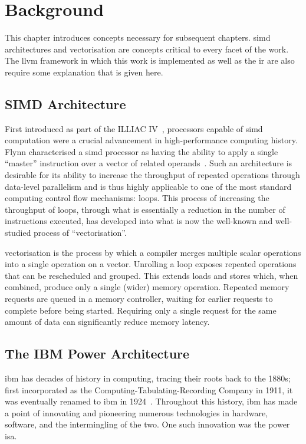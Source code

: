 \documentclass[\main/thesis.tex]{subfiles}
\begin{document}
\chapter{Background}
\label{cha:background}
This chapter introduces concepts necessary for subsequent chapters.
\gls{simd} architectures and vectorisation are concepts critical to every facet of the work.
The \gls{llvm} framework in which this work is implemented as well as the \gls{ir} are also require some explanation that is given here.

\section{SIMD Architecture}
\label{sec:simd}
First introduced as part of the ILLIAC IV~\autocite{barnes1968illiac}, processors capable of \gls{simd} computation were a crucial advancement in high-performance computing history.
Flynn characterised a \gls{simd} processor as having the ability to apply a single ``master'' instruction over a vector of related operands~\autocite{flynn1972some}.
Such an architecture is desirable for its ability to increase the throughput of repeated operations through data-level parallelism and is thus highly applicable to one of the most standard computing control flow mechanisms: loops.
This process of increasing the throughput of loops, through what is essentially a reduction in the number of instructions executed, has developed into what is now the well-known and well-studied process of ``\gls{vectorisation}''.

\Gls{vectorisation} is the process by which a compiler merges multiple scalar operations into a single operation on a vector.
Unrolling a loop exposes repeated operations that can be rescheduled and grouped.
This extends loads and stores which, when combined, produce only a single (wider) memory operation.
Repeated memory requests are queued in a memory controller, waiting for earlier requests to complete before being started.
Requiring only a single request for the same amount of data can significantly reduce memory latency.

\section{The IBM Power Architecture}
\Gls{ibm} has decades of history in computing, tracing their roots back to the 1880s; first incorporated as the Computing-Tabulating-Recording Company in 1911, it was eventually renamed to \gls{ibm} in 1924~\autocite{ibmarchive}.
Throughout this history, \gls{ibm} has made a point of innovating and pioneering numerous technologies in hardware, software, and the intermingling of the two.
One such innovation was the \gls{power} \gls{isa}.
\end{document}

